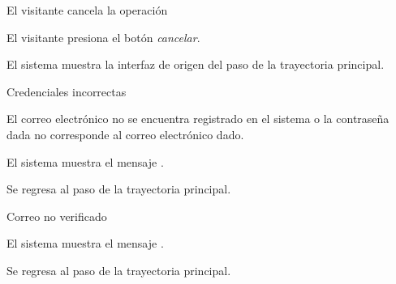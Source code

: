 {\begin{trayectoriaPrincipal}
  \end{trayectoriaPrincipal}


  \begin{trayectoriaAlternativa}[ta:cancelar]
    {El visitante cancela la operación}

    \item El visitante presiona el botón \textit{cancelar}.

    \item El sistema muestra la interfaz de origen del paso
       de la trayectoria principal.

  \end{trayectoriaAlternativa}


  \begin{trayectoriaAlternativa}
    {Credenciales incorrectas}

    \item El correo electrónico no se encuentra registrado en el sistema o la
      contraseña dada no corresponde al correo electrónico dado.

    \item El sistema muestra el mensaje
      .

    \item Se regresa al paso  de la trayectoria
      principal.

  \end{trayectoriaAlternativa}


  \begin{trayectoriaAlternativa}
    {Correo no verificado}

    \item El sistema muestra el mensaje
      .

    \item Se regresa al paso  de la trayectoria
      principal.

  \end{trayectoriaAlternativa}


}
